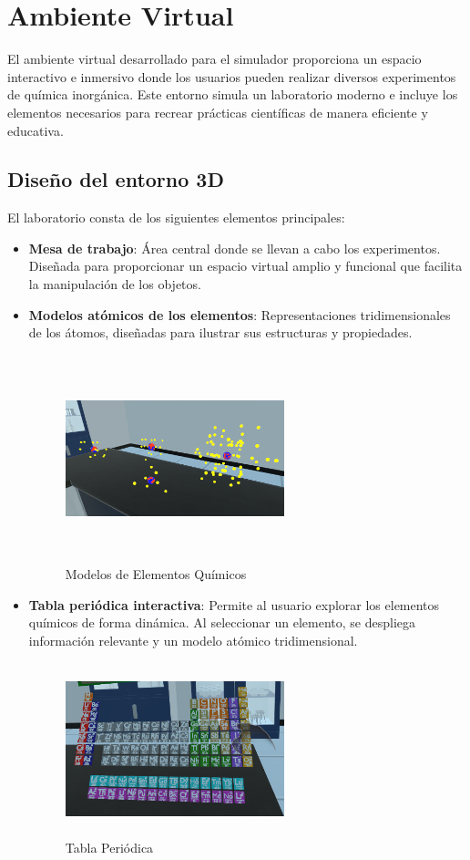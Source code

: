 \section{Ambiente Virtual} \label{sec:Ambiente_Virtual}

El ambiente virtual desarrollado para el simulador proporciona un espacio interactivo e inmersivo donde los usuarios pueden realizar diversos experimentos de química inorgánica. Este entorno simula un laboratorio moderno e incluye los elementos necesarios para recrear prácticas científicas de manera eficiente y educativa.
\subsection{Diseño del entorno 3D}
El laboratorio consta de los siguientes elementos principales:
\begin{itemize}
    \item \textbf{Mesa de trabajo}: Área central donde se llevan a cabo los experimentos. Diseñada para proporcionar un espacio virtual amplio y funcional que facilita la manipulación de los objetos.
    \item \textbf{Modelos atómicos de los elementos}: Representaciones tridimensionales de los átomos, diseñadas para ilustrar sus estructuras y propiedades.
    \begin{figure}[thbp]
        \centering
        \includegraphics[width=0.6\textwidth, height = 6cm]{img/chapter04/Elementos.png}
        \caption{Modelos de Elementos Químicos}
        \label{fig:Elementos_Químicos}
    \end{figure}
    \newpage
    \item \textbf{Tabla periódica interactiva}: Permite al usuario explorar los elementos químicos de forma dinámica. Al seleccionar un elemento, se despliega información relevante y un modelo atómico tridimensional.
    \begin{figure}[thbp]
        \centering
        \includegraphics[width=0.6\textwidth, height = 5cm]{img/chapter05/Tabla_Periodica.png}
        \caption{Tabla Periódica}
        \label{fig:Tabla_Periódica}
    \end{figure}


\end{itemize}
